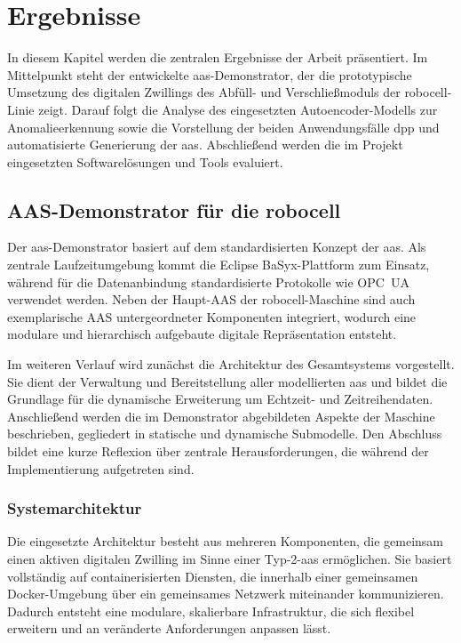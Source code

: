 \newpage
\section{Ergebnisse}
In diesem Kapitel werden die zentralen Ergebnisse der Arbeit präsentiert.
Im Mittelpunkt steht der entwickelte \acs{aas}-Demonstrator, der die prototypische Umsetzung des digitalen Zwillings des Abfüll- und Verschließmoduls der robocell-Linie zeigt.
Darauf folgt die Analyse des eingesetzten Autoencoder-Modells zur Anomalieerkennung sowie die Vorstellung der beiden Anwendungsfälle \acs{dpp} und automatisierte Generierung der \acs{aas}.
Abschließend werden die im Projekt eingesetzten Softwarelösungen und Tools evaluiert.

\subsection{AAS-Demonstrator für die robocell}
Der \acs{aas}-Demonstrator basiert auf dem standardisierten Konzept der \acs{aas}.
Als zentrale Laufzeitumgebung kommt die Eclipse BaSyx-Plattform zum Einsatz, während für die Datenanbindung standardisierte Protokolle wie OPC~UA verwendet werden.
Neben der Haupt-AAS der robocell-Maschine sind auch exemplarische AAS untergeordneter Komponenten integriert, wodurch eine modulare und hierarchisch aufgebaute digitale Repräsentation entsteht.

Im weiteren Verlauf wird zunächst die Architektur des Gesamtsystems vorgestellt.
Sie dient der Verwaltung und Bereitstellung aller modellierten \acs{aas} und bildet die Grundlage für die dynamische Erweiterung um Echtzeit- und Zeitreihendaten.
Anschließend werden die im Demonstrator abgebildeten Aspekte der Maschine beschrieben, gegliedert in statische und dynamische Submodelle.
Den Abschluss bildet eine kurze Reflexion über zentrale Herausforderungen, die während der Implementierung aufgetreten sind.

\subsubsection{Systemarchitektur}
Die eingesetzte Architektur besteht aus mehreren Komponenten, die gemeinsam einen aktiven digitalen Zwilling im Sinne einer Typ-2-\acs{aas} ermöglichen.
Sie basiert vollständig auf containerisierten Diensten, die innerhalb einer gemeinsamen Docker-Umgebung über ein gemeinsames Netzwerk miteinander kommunizieren.
Dadurch entsteht eine modulare, skalierbare Infrastruktur, die sich flexibel erweitern und an veränderte Anforderungen anpassen lässt.

